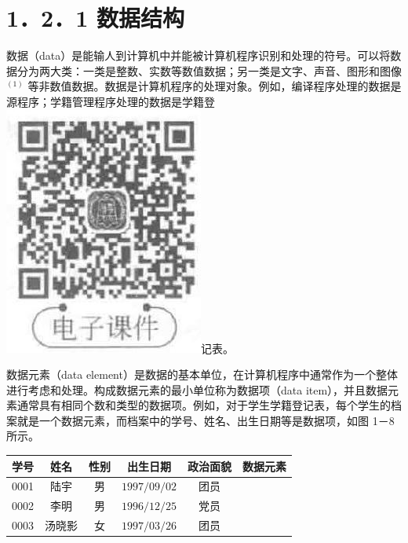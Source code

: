 \documentclass[10pt]{article}
\begin{document}
\section*{1．2．1 数据结构}
数据（data）是能输人到计算机中并能被计算机程序识别和处理的符号。可以将数据分为两大类：一类是整数、实数等数值数据；另一类是文字、声音、图形和图像 ${ }^{(1)}$ 等非数值数据。数据是计算机程序的处理对象。例如，编译程序处理的数据是源程序；学籍管理程序处理的数据是学籍登\\
\includegraphics[max width=\textwidth]{2025_06_06_704745ea57b15b2333e5g-022}记表。

数据元素（data element）是数据的基本单位，在计算机程序中通常作为一个整体进行考虑和处理。构成数据元素的最小单位称为数据项（data item），并且数据元素通常具有相同个数和类型的数据项。例如，对于学生学籍登记表，每个学生的档案就是一个数据元素，而档案中的学号、姓名、出生日期等是数据项，如图 1－8 所示。

\begin{center}
\begin{tabular}{|c|c|c|c|c|c|}
\hline
学号 & 姓名 & 性别 & 出生日期 & 政治面貌 & \multirow{2}{*}{数据元素} \\
\hline
0001 & 陆宇 & 男 & $1997 / 09 / 02$ & 团员 &  \\
\hline
0002 & 李明 & 男 & $1996 / 12 / 25$ & 党员 &  \\
\hline
0003 & 汤晓影 & 女 & $1997 / 03 / 26$ & 团员 &  \\
\hline
\end{tabular}
\end{center}
\end{document}
